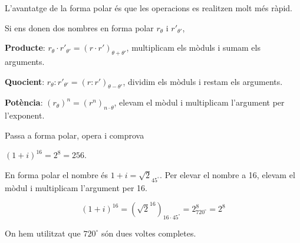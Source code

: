 	\begin{theorybox}
		L'avantatge de la forma polar és que les operacions es realitzen molt més ràpid.
		
		Si ens donen dos nombres en forma polar $r_\theta$ i $r'_{\theta'}$, 
		
		\textbf{Producte}: $r_\theta \cdot r'_{\theta'} = (r\cdot r')_{\theta+\theta'}$, multiplicam els mòduls i sumam els arguments.
		
		\textbf{Quocient}: $r_\theta : r'_{\theta'} = (r : r')_{\theta - \theta'}$, dividim els mòduls i restam els arguments.
		
		\textbf{Potència}:  $(r_\theta)^n = (r^n)_{n\cdot \theta}$, elevam el mòdul i multiplicam l'argument per l'exponent.
	\end{theorybox}
	
	\begin{resolt}[E]{Passa a forma polar, opera i comprova 
			
			$(1+i)^{16} = 2^8 = 256$.}
			En forma polar el nombre és $1+i=\sqrt{2}_{45^\circ}$. Per elevar el nombre a 16, elevam el mòdul i multiplicam l'argument per 16.
		
		\begin{equation*}
		(1+i)^{16}=(\sqrt{2}^{16} )_{16\cdot 45^\circ} = 2^8_{720^\circ}=2^8
		\end{equation*}
		
		On hem utilitzat que $720^\circ$ són dues voltes completes.
	\end{resolt}
	
